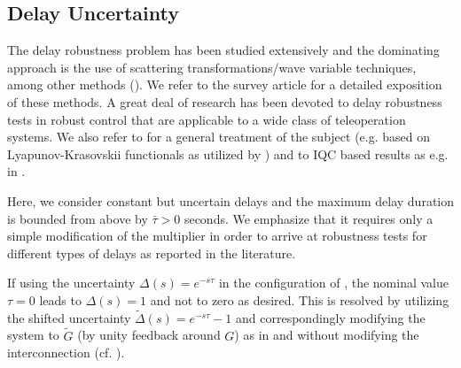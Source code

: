 \subsection{Delay Uncertainty}\label{sec:delayiqc}

The delay robustness problem has been studied extensively and the dominating approach 
is the use of scattering transformations/wave variable techniques, among other methods 
(\cite{leungfa, eusebi, andersonspong, nieslotine, nieslotine2, hokayemspong, yokokohji, 
lozano, arcara, parkcho, aziminejad, leespong}). We refer to the survey article \cite{hokayemspong} 
for a detailed exposition of these methods. A great deal of research has been devoted to 
delay robustness tests in robust control that are applicable to a wide class of teleoperation 
systems. We also refer to \cite{richard} for a general treatment of the subject (e.g. based on 
Lyapunov-Krasovskii functionals as utilized by \cite{delgado}) and to IQC based results as e.g. 
in \cite{scorletti,junsafonov,kaorantzer,niculescu}. 

Here, we consider constant but uncertain delays and the maximum delay duration is bounded 
from above by $\bar{\tau} > 0$ seconds. We emphasize that it requires only a simple 
modification of the multiplier in order to arrive at robustness tests for different types 
of delays as reported in the literature.


If using the uncertainty $\Delta(s)=e^{-s\tau}$ in the configuration of , 
the nominal value $\tau=0$ leads to $\Delta(s)=1$ and not to zero as desired. This is resolved 
by utilizing the shifted uncertainty $\tilde{\Delta}(s)=e^{-s\tau}-1$ and correspondingly 
modifying the system to $\tilde{G}$ (by unity feedback around $G$) as in 
 and without modifying the interconnection (cf. \cite{leungfa}).

